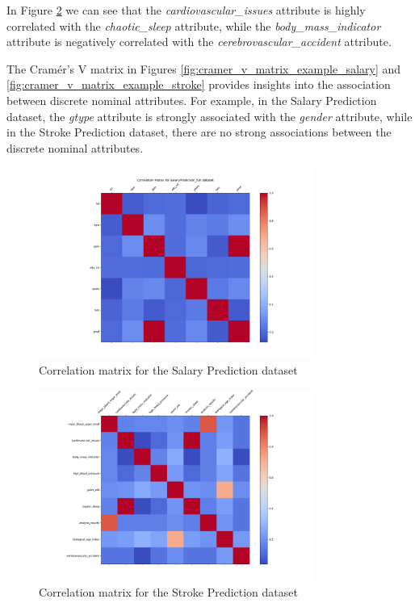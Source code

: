 \documentclass[runningheads]{paper}
\begin{document}
In Figure \ref{fig:correlation_matrix_example_stroke} we can see that the
\textit{cardiovascular\_issues} attribute is highly correlated with the
\textit{chaotic\_sleep} attribute, while the \textit{body\_mass\_indicator} 
attribute is negatively correlated with the \textit{cerebrovascular\_accident}
attribute.

The Cramér's V matrix in Figures \ref{fig:cramer_v_matrix_example_salary} and
\ref{fig:cramer_v_matrix_example_stroke} provides insights into the association
between discrete nominal attributes. For example, in the Salary Prediction dataset,
the \textit{gtype} attribute is strongly associated with the \textit{gender} attribute,
while in the Stroke Prediction dataset, there are no strong associations between
the discrete nominal attributes.

\begin{figure}[H]
    \centering
    \includegraphics[width=0.8\textwidth]{../plots/correlation_matrix_SalaryPrediction_full.png}
    \caption{Correlation matrix for the Salary Prediction dataset}
    \label{fig:correlation_matrix_example_salary}
\end{figure}

\begin{figure}[H]
    \centering
    \includegraphics[width=0.8\textwidth]{../plots/correlation_matrix_AVC_full.png}
    \caption{Correlation matrix for the Stroke Prediction dataset}
    \label{fig:correlation_matrix_example_stroke}
\end{figure}
\end{document}
